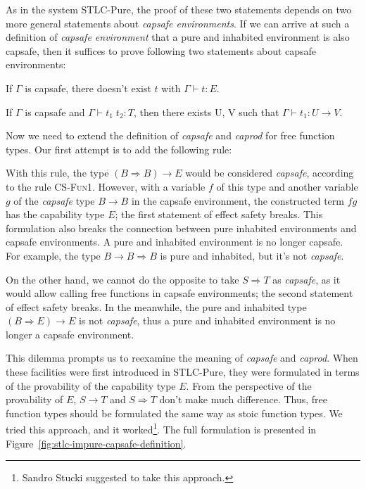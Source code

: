 As in the system STLC-Pure, the proof of these two statements depends
on two more general statements about \emph{capsafe environments}. If
we can arrive at such a definition of \emph{capsafe environment} that
a pure and inhabited environment is also capsafe, then it suffices to
prove following two statements about capsafe environments:

\begin{definition}
  If $\Gamma$ is capsafe, there doesn't exist $t$ with
  $\Gamma \vdash t : E$.
\end{definition}

\begin{definition}
  If $\Gamma$ is capsafe and $\Gamma \vdash t_1 \; t_2 : T$, then
  there exists U, V such that $\Gamma \vdash t_1 : U \to V$.
\end{definition}

Now we need to extend the definition of \emph{capsafe} and
\emph{caprod} for free function types. Our first attempt is to add
the following rule:


With this rule, the type $(B \Rightarrow B) \to E$ would be considered
\emph{capsafe}, according to the rule \textsc{CS-Fun1}. However, with
a variable $f$ of this type and another variable $g$ of the
\emph{capsafe} type $B \to B$ in the capsafe environment, the
constructed term $f g$ has the capability type $E$; the first
statement of effect safety breaks. This formulation also breaks the
connection between pure inhabited environments and capsafe
environments. A pure and inhabited environment is no longer
capsafe. For example, the type $B \to B \Rightarrow B$ is pure and
inhabited, but it's not \emph{capsafe}.

On the other hand, we cannot do the opposite to take $S \Rightarrow T$
as \emph{capsafe}, as it would allow calling free functions in capsafe
environments; the second statement of effect safety breaks. In the
meanwhile, the pure and inhabited type $(B \Rightarrow E) \to E$ is
not \emph{capsafe}, thus a pure and inhabited environment is no longer
a capsafe environment.

This dilemma prompts us to reexamine the meaning of \emph{capsafe} and
\emph{caprod}. When these facilities were first introduced in
STLC-Pure, they were formulated in terms of the provability of the
capability type $E$. From the perspective of the provability of $E$,
$S \to T$ and $S \Rightarrow T$ don't make much difference. Thus, free
function types should be formulated the same way as stoic function
types. We tried this approach, and it worked\footnote{Sandro Stucki
  suggested to take this approach.}. The full formulation is presented
in Figure~\ref{fig:stlc-impure-capsafe-definition}.

